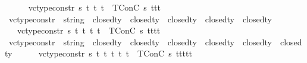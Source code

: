 \begin{isabellebody}
\ \ \isanewline
\ \ \ {\isachardoublequoteopen}vc{\isacharunderscore}{\kern0pt}type{\isacharunderscore}{\kern0pt}constr{}\ s\ t{}\ t{}\ t{}\ {\isacharequal}{\kern0pt}\ TConC\ s\ {\isacharbrackleft}{\kern0pt}t{}{\isacharcomma}{\kern0pt}t{}{\isacharcomma}{\kern0pt}t{}{\isacharbrackright}{\kern0pt}{\isachardoublequoteclose}\isanewline
\isanewline
{}\isamarkupfalse%
\ vc{\isacharunderscore}{\kern0pt}type{\isacharunderscore}{\kern0pt}constr{}\ {\isacharcolon}{\kern0pt}{\isacharcolon}{\kern0pt}\ {\isachardoublequoteopen}string\ {\isasymRightarrow}\ closed{\isacharunderscore}{\kern0pt}ty\ {\isasymRightarrow}\ closed{\isacharunderscore}{\kern0pt}ty\ {\isasymRightarrow}\ closed{\isacharunderscore}{\kern0pt}ty\ {\isasymRightarrow}\ closed{\isacharunderscore}{\kern0pt}ty\ {\isasymRightarrow}\ closed{\isacharunderscore}{\kern0pt}ty{\isachardoublequoteclose}\isanewline
\ \ \isanewline
\ \ \ {\isachardoublequoteopen}vc{\isacharunderscore}{\kern0pt}type{\isacharunderscore}{\kern0pt}constr{}\ s\ t{}\ t{}\ t{}\ t{}\ {\isacharequal}{\kern0pt}\ TConC\ s\ {\isacharbrackleft}{\kern0pt}t{}{\isacharcomma}{\kern0pt}t{}{\isacharcomma}{\kern0pt}t{}{\isacharcomma}{\kern0pt}t{}{\isacharbrackright}{\kern0pt}{\isachardoublequoteclose}\isanewline
\isanewline
{}\isamarkupfalse%
\ vc{\isacharunderscore}{\kern0pt}type{\isacharunderscore}{\kern0pt}constr{}\ {\isacharcolon}{\kern0pt}{\isacharcolon}{\kern0pt}\ {\isachardoublequoteopen}string\ {\isasymRightarrow}\ closed{\isacharunderscore}{\kern0pt}ty\ {\isasymRightarrow}\ closed{\isacharunderscore}{\kern0pt}ty\ {\isasymRightarrow}\ closed{\isacharunderscore}{\kern0pt}ty\ {\isasymRightarrow}\ closed{\isacharunderscore}{\kern0pt}ty\ {\isasymRightarrow}\ closed{\isacharunderscore}{\kern0pt}ty\ {\isasymRightarrow}\ closed{\isacharunderscore}{\kern0pt}ty{\isachardoublequoteclose}\isanewline
\ \ \isanewline
\ \ \ {\isachardoublequoteopen}vc{\isacharunderscore}{\kern0pt}type{\isacharunderscore}{\kern0pt}constr{}\ s\ t{}\ t{}\ t{}\ t{}\ t{}\ {\isacharequal}{\kern0pt}\ TConC\ s\ {\isacharbrackleft}{\kern0pt}t{}{\isacharcomma}{\kern0pt}t{}{\isacharcomma}{\kern0pt}t{}{\isacharcomma}{\kern0pt}t{}{\isacharcomma}{\kern0pt}t{}{\isacharbrackright}{\kern0pt}{\isachardoublequoteclose}\isanewline

\end{isabellebody}
